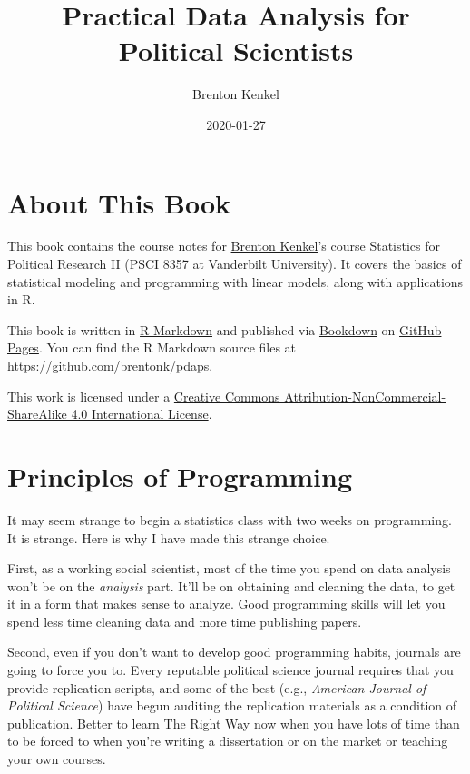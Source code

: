 \documentclass[
  12pt,
  oneside,openany]{book}
\title{Practical Data Analysis for Political Scientists}
\author{Brenton Kenkel}
\date{2020-01-27}
\begin{document}
\frontmatter
\maketitle

{
\setcounter{tocdepth}{1}
\tableofcontents
}
\mainmatter
\hypertarget{about-this-book}{%
\chapter{About This Book}\label{about-this-book}}

This book contains the course notes for \href{http://bkenkel.com}{Brenton Kenkel}'s course Statistics for Political Research II (PSCI 8357 at Vanderbilt University). It covers the basics of statistical modeling and programming with linear models, along with applications in R.

This book is written in \href{http://rmarkdown.rstudio.com}{R Markdown} and published via \href{https://bookdown.org}{Bookdown} on \href{https://pages.github.com}{GitHub Pages}. You can find the R Markdown source files at \url{https://github.com/brentonk/pdaps}.

This work is licensed under a \href{http://creativecommons.org/licenses/by-nc-sa/4.0/}{Creative Commons Attribution-NonCommercial-ShareAlike 4.0 International License}.

\hypertarget{programming}{%
\chapter{Principles of Programming}\label{programming}}

It may seem strange to begin a statistics class with two weeks on programming. It is strange. Here is why I have made this strange choice.

First, as a working social scientist, most of the time you spend on data analysis won't be on the \emph{analysis} part. It'll be on obtaining and cleaning the data, to get it in a form that makes sense to analyze. Good programming skills will let you spend less time cleaning data and more time publishing papers.

Second, even if you don't want to develop good programming habits, journals are going to force you to. Every reputable political science journal requires that you provide replication scripts, and some of the best (e.g., \emph{American Journal of Political Science}) have begun auditing the replication materials as a condition of publication. Better to learn The Right Way now when you have lots of time than to be forced to when you're writing a dissertation or on the market or teaching your own courses.
\end{document}
